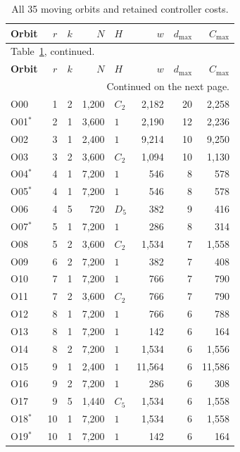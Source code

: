 \documentclass[a4paper,11pt]{article}
\begin{document}
\begingroup\small
\begin{longtable}{@{}lrrrlrrr@{}}
\caption{All 35 moving orbits and retained controller costs.}\label{tab:orbit-census}\\
\toprule\textbf{Orbit} & \(r\) & \(k\) & \(N\) & \(H\) & \(w\) & \(d_{\max}\) & \(C_{\max}\)\\\midrule\endfirsthead
\multicolumn{8}{l}{\small Table~\ref{tab:orbit-census}, continued.}\\
\toprule\textbf{Orbit} & \(r\) & \(k\) & \(N\) & \(H\) & \(w\) & \(d_{\max}\) & \(C_{\max}\)\\\midrule\endhead
\midrule\multicolumn{8}{r}{\small Continued on the next page.}\\\endfoot
\bottomrule\endlastfoot
O00 & 1 & 2 & 1,200 & \(C_{2}\) & 2,182 & 20 & 2,258 \\
O01\(^{*}\) & 2 & 1 & 3,600 & \(1\) & 2,190 & 12 & 2,236 \\
O02 & 3 & 1 & 2,400 & \(1\) & 9,214 & 10 & 9,250 \\
O03 & 3 & 2 & 3,600 & \(C_{2}\) & 1,094 & 10 & 1,130 \\
O04\(^{*}\) & 4 & 1 & 7,200 & \(1\) & 546 & 8 & 578 \\
O05\(^{*}\) & 4 & 1 & 7,200 & \(1\) & 546 & 8 & 578 \\
O06 & 4 & 5 & 720 & \(D_{5}\) & 382 & 9 & 416 \\
O07\(^{*}\) & 5 & 1 & 7,200 & \(1\) & 286 & 8 & 314 \\
O08 & 5 & 2 & 3,600 & \(C_{2}\) & 1,534 & 7 & 1,558 \\
O09 & 6 & 2 & 7,200 & \(1\) & 382 & 7 & 408 \\
O10 & 7 & 1 & 7,200 & \(1\) & 766 & 7 & 790 \\
O11 & 7 & 2 & 3,600 & \(C_{2}\) & 766 & 7 & 790 \\
O12 & 8 & 1 & 7,200 & \(1\) & 766 & 6 & 788 \\
O13 & 8 & 1 & 7,200 & \(1\) & 142 & 6 & 164 \\
O14 & 8 & 2 & 7,200 & \(1\) & 1,534 & 6 & 1,556 \\
O15 & 9 & 1 & 2,400 & \(1\) & 11,564 & 6 & 11,586 \\
O16 & 9 & 2 & 7,200 & \(1\) & 286 & 6 & 308 \\
O17 & 9 & 5 & 1,440 & \(C_{5}\) & 1,534 & 6 & 1,558 \\
O18\(^{*}\) & 10 & 1 & 7,200 & \(1\) & 1,534 & 6 & 1,558 \\
O19\(^{*}\) & 10 & 1 & 7,200 & \(1\) & 142 & 6 & 164 \\

\end{longtable}
\end{document}
